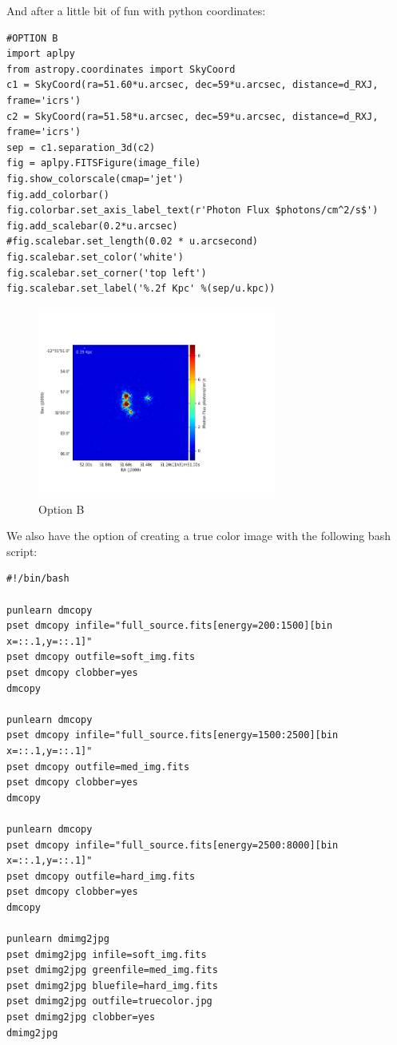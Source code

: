 \documentclass[11pt,letterpaper]{article}
\begin{document}
And after a little bit of fun with python coordinates:
\begin{lstlisting}
#OPTION B
import aplpy
from astropy.coordinates import SkyCoord
c1 = SkyCoord(ra=51.60*u.arcsec, dec=59*u.arcsec, distance=d_RXJ, frame='icrs') 
c2 = SkyCoord(ra=51.58*u.arcsec, dec=59*u.arcsec, distance=d_RXJ, frame='icrs') 
sep = c1.separation_3d(c2)  
fig = aplpy.FITSFigure(image_file)
fig.show_colorscale(cmap='jet')
fig.add_colorbar()
fig.colorbar.set_axis_label_text(r'Photon Flux $photons/cm^2/s$')
fig.add_scalebar(0.2*u.arcsec)
#fig.scalebar.set_length(0.02 * u.arcsecond)
fig.scalebar.set_color('white')
fig.scalebar.set_corner('top left')
fig.scalebar.set_label('%.2f Kpc' %(sep/u.kpc))
\end{lstlisting}
\begin{figure}[h]
	\centering
	\includegraphics[width=0.7\textwidth]{pictures/optionB}
	\caption{Option B}
	\label{fig:2DopB}
\end{figure}
\clearpage
We also have the option of creating a true color image with the following bash script:
\begin{lstlisting}
#!/bin/bash

punlearn dmcopy 
pset dmcopy infile="full_source.fits[energy=200:1500][bin x=::.1,y=::.1]"
pset dmcopy outfile=soft_img.fits
pset dmcopy clobber=yes
dmcopy

punlearn dmcopy 
pset dmcopy infile="full_source.fits[energy=1500:2500][bin x=::.1,y=::.1]"
pset dmcopy outfile=med_img.fits
pset dmcopy clobber=yes
dmcopy

punlearn dmcopy 
pset dmcopy infile="full_source.fits[energy=2500:8000][bin x=::.1,y=::.1]"
pset dmcopy outfile=hard_img.fits
pset dmcopy clobber=yes
dmcopy

punlearn dmimg2jpg
pset dmimg2jpg infile=soft_img.fits
pset dmimg2jpg greenfile=med_img.fits
pset dmimg2jpg bluefile=hard_img.fits
pset dmimg2jpg outfile=truecolor.jpg
pset dmimg2jpg clobber=yes
dmimg2jpg
\end{lstlisting}
\end{document}
